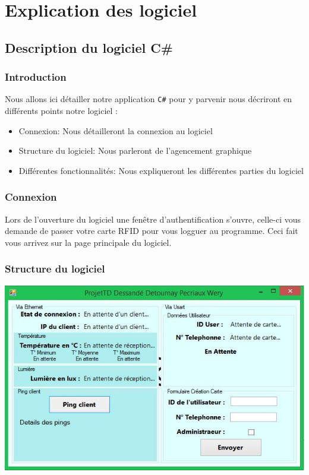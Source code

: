 \documentclass[12pt,a4paper]{report}
\begin{document}
			
\chapter{Explication des logiciel}
	\section{Description du logiciel C\#}
		\subsection{Introduction}
		Nous allons ici détailler notre application \verb+C#+ pour y parvenir nous décriront en différents points notre logiciel : 
			\begin{itemize}
			\item Connexion: Nous détailleront la connexion au logiciel
			\item Structure du logiciel: Nous parleront de l'agencement graphique
			\item Différentes fonctionnalités: Nous expliqueront les différentes parties du logiciel
			\end{itemize}
		\subsection{Connexion}
		Lors de l'ouverture du logiciel une fenêtre d'authentification s'ouvre, celle-ci  vous demande de passer votre carte RFID pour vous logguer au programme. Ceci fait vous arrivez sur la page principale du logiciel.
		\subsection{Structure du logiciel}
		\begin{center}
		\includegraphics[scale=0.6]{ImageElec.jpg}
		\end{center}
		
\end{document}
